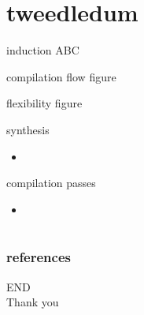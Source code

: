 \documentclass[aspectratio=1610]{beamer}
\begin{document}
\section{tweedledum}
\begin{frame}{induction}  
  ABC 
\end{frame}
\begin{frame}{compilation flow}
  figure
\end{frame}
\begin{frame}{flexibility}
  figure
\end{frame}
\begin{frame}{synthesis}
  \begin{itemize}
    \item 
  \end{itemize}  
\end{frame}
\begin{frame}{compilation passes}
  \begin{itemize}
    \item 
  \end{itemize}
\end{frame}
\section*{}
\begin{frame}
	\frametitle{references}
	\printbibliography
\end{frame}
\begin{frame}
\centering
\Huge{END\\Thank you}
\end{frame}
\end{document}
